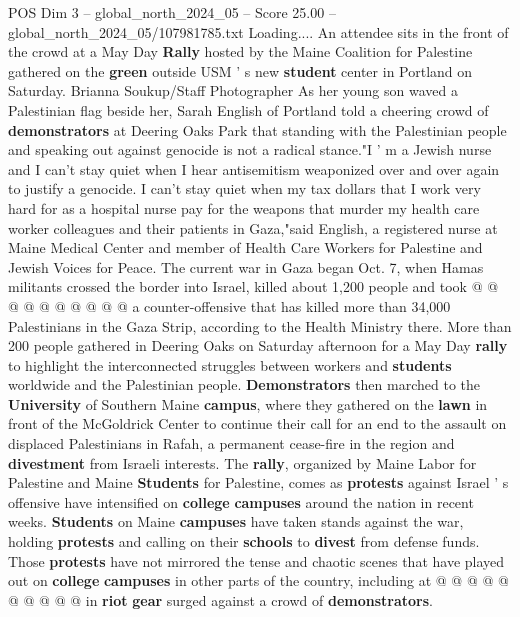 \begin{textsample}{POS Dim 3 – global\_north\_2024\_05 – Score 25.00 – global\_north\_2024\_05/107981785.txt}  \label{ex:f3_pos_017}
Loading....
An attendee sits in the front of the crowd at a May Day \textbf{Rally} hosted by the Maine Coalition for Palestine gathered on the \textbf{green} outside USM ' s new \textbf{student} center in Portland on Saturday.
Brianna Soukup/Staff Photographer As her young son waved a Palestinian flag beside her, Sarah English of Portland told a cheering crowd of \textbf{demonstrators} at Deering Oaks Park that standing with the Palestinian people and speaking out against genocide is not a radical stance."I ' m a Jewish nurse and I can't stay quiet when I hear antisemitism weaponized over and over again to justify a genocide.
I can't stay quiet when my tax dollars that I work very hard for as a hospital nurse pay for the weapons that murder my health care worker colleagues and their patients in Gaza,"said English, a registered nurse at Maine Medical Center and member of Health Care Workers for Palestine and Jewish Voices for Peace.
The current war in Gaza began Oct. 7, when Hamas militants crossed the border into Israel, killed about 1,200 people and took @ @ @ @ @ @ @ @ @ @ a counter-offensive that has killed more than 34,000 Palestinians in the Gaza Strip, according to the Health Ministry there.
More than 200 people gathered in Deering Oaks on Saturday afternoon for a May Day \textbf{rally} to highlight the interconnected struggles between workers and \textbf{students} worldwide and the Palestinian people. \textbf{Demonstrators} then marched to the \textbf{University} of Southern Maine \textbf{campus}, where they gathered on the \textbf{lawn} in front of the McGoldrick Center to continue their call for an end to the assault on displaced Palestinians in Rafah, a permanent cease-fire in the region and \textbf{divestment} from Israeli interests.
The \textbf{rally}, organized by Maine Labor for Palestine and Maine \textbf{Students} for Palestine, comes as \textbf{protests} against Israel ' s offensive have intensified on \textbf{college} \textbf{campuses} around the nation in recent weeks. \textbf{Students} on Maine \textbf{campuses} have taken stands against the war, holding \textbf{protests} and calling on their \textbf{schools} to \textbf{divest} from defense funds.
Those \textbf{protests} have not mirrored the tense and chaotic scenes that have played out on \textbf{college} \textbf{campuses} in other parts of the country, including at @ @ @ @ @ @ @ @ @ @ in \textbf{riot} \textbf{gear} surged against a crowd of \textbf{demonstrators}.

\end{textsample}
